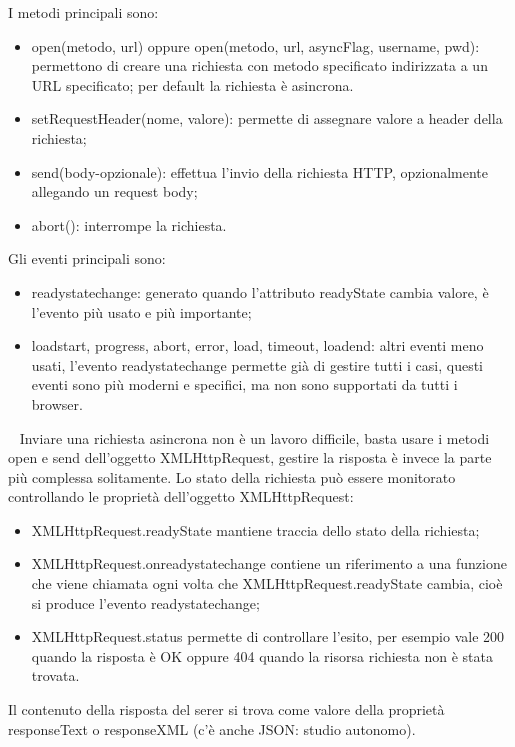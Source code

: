 I metodi principali sono:
\begin{itemize}
    \item open(metodo, url) oppure open(metodo, url, asyncFlag, username, pwd): permettono di creare una richiesta con metodo specificato indirizzata a un URL specificato; per default la richiesta è asincrona.
    \item setRequestHeader(nome, valore): permette di assegnare valore a header della richiesta;
    \item send(body-opzionale): effettua l'invio della richiesta HTTP, opzionalmente allegando un request body;
    \item abort(): interrompe la richiesta.
\end{itemize}
Gli eventi principali sono:
\begin{itemize}
    \item readystatechange: generato quando l'attributo readyState cambia valore, è l'evento più usato e più importante;
    \item loadstart, progress, abort, error, load, timeout, loadend: altri eventi meno usati, l'evento readystatechange permette già di gestire tutti i casi, questi eventi sono più moderni e specifici, ma non sono supportati da tutti i browser.
\end{itemize}
\ \newline
Inviare una richiesta asincrona non è un lavoro difficile, basta usare i metodi open e send dell'oggetto XMLHttpRequest, gestire la risposta è invece la parte più complessa solitamente.\newline
Lo stato della richiesta può essere monitorato controllando le proprietà dell'oggetto XMLHttpRequest:
\begin{itemize}
    \item XMLHttpRequest.readyState mantiene traccia dello stato della richiesta;
    \item XMLHttpRequest.onreadystatechange contiene un riferimento a una funzione che viene chiamata ogni volta che XMLHttpRequest.readyState cambia, cioè si produce l'evento readystatechange;
    \item XMLHttpRequest.status permette di controllare l'esito, per esempio vale 200 quando la risposta è OK oppure 404 quando la risorsa richiesta non è stata trovata.
\end{itemize}
Il contenuto della risposta del serer si trova come valore della proprietà responseText o responseXML (c'è anche JSON: studio autonomo).\newline
\newline
